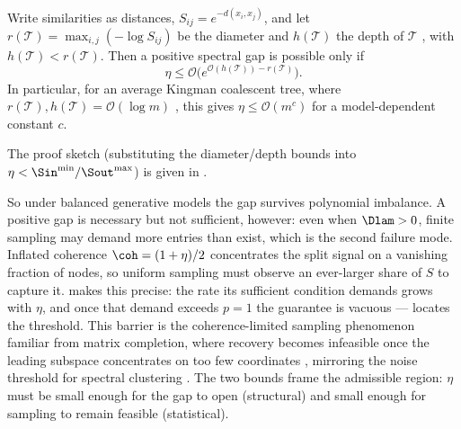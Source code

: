 \begin{corollary}\label{cor:tolerance}
Write similarities as distances, $S_{ij}=e^{-d(x_i,x_j)}$, and let
$r(\mathcal T)=\max_{i,j}(-\log S_{ij})$ be the diameter and $h(\mathcal T)$ the
depth of $\mathcal T$ \cite{aizenbud2023spectral}, with $h(\mathcal T)<r(\mathcal T)$.
Then a positive spectral gap is possible only if
\begin{equation}\label{eq:eta_distance_bound}
   \eta\le\mathcal O\!\bigl(e^{\mathcal O(h(\mathcal T))-r(\mathcal T)}\bigr).
\end{equation}
In particular, for an average Kingman coalescent tree, where
$r(\mathcal T),h(\mathcal T)=\mathcal O(\log m)$
\cite{erdos1999logs, aldous2001stochastic}, this gives $\eta\le\mathcal O(m^c)$ for
a model-dependent constant $c$.
\end{corollary}
\noindent The proof sketch (substituting the diameter/depth bounds into
$\eta<\Sin^{\min}/\Sout^{\max}$) is given in .

So under balanced generative models the gap survives polynomial imbalance. A
positive gap is necessary but not sufficient, however: even when $\Dlam>0$,
finite sampling may demand more entries than exist, which is the second failure
mode. Inflated coherence $\coh=(1+\eta)/2$ concentrates the split signal on a vanishing
fraction of nodes, so uniform sampling must observe an ever-larger share of $S$ to
capture it.  makes this precise: the rate its sufficient
condition demands grows with $\eta$, and once that demand exceeds $p=1$ the
guarantee is vacuous ---  locates the threshold. This barrier is the
coherence-limited sampling phenomenon familiar from matrix completion, where
recovery becomes infeasible once the leading subspace concentrates on too few
coordinates \cite{candes2009power, recht2011simpler, chen2014completing},
mirroring the noise threshold for spectral clustering
\cite{Balakrishnan2011clustering}. The two bounds frame the admissible region:
$\eta$ must be small enough for the gap to open (structural) and small enough for
sampling to remain feasible (statistical).
